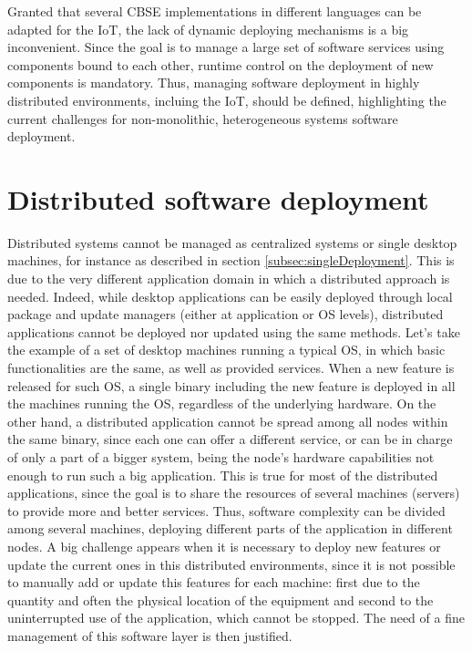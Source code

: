 Granted that several CBSE implementations in different languages can be adapted for the IoT, the lack of dynamic deploying mechanisms is a big inconvenient.
Since the goal is to manage a large set of software services using components bound to each other, runtime control on the deployment of new components is mandatory.
Thus, managing software deployment in highly distributed environments, incluing the IoT, should be defined, highlighting the current challenges for non-monolithic, heterogeneous systems software deployment.

\section{Distributed software deployment}
\label{sec:distDeployment}
Distributed systems cannot be managed as centralized systems or single desktop machines, for instance as described in section \ref{subsec:singleDeployment}.
This is due to the very different application domain in which a distributed approach is needed.
Indeed, while desktop applications can be easily deployed through local package and update managers (either at application or OS levels), distributed applications cannot be deployed nor updated using the same methods.
Let's take the example of a set of desktop machines running a typical OS, in which basic functionalities are the same, as well as provided services.
When a new feature is released for such OS, a single binary including the new feature is deployed in all the machines running the OS, regardless of the underlying hardware.
On the other hand, a distributed application cannot be spread among all nodes within the same binary, since each one can offer a different service, or can be in charge of only a part of a bigger system, being the node's hardware capabilities not enough to run such a big application.
This is true for most of the distributed applications, since the goal is to share the resources of several machines (servers) to provide more and better services.
Thus, software complexity can be divided among several machines, deploying different parts of the application in different nodes.
A big challenge appears when it is necessary to deploy new features or update the current ones in this distributed environments, since it is not possible to manually add or update this features for each machine: first due to the quantity and often the physical location of the equipment and second to the uninterrupted use of the application, which cannot be stopped.
The need of a fine management of this software layer is then justified.

